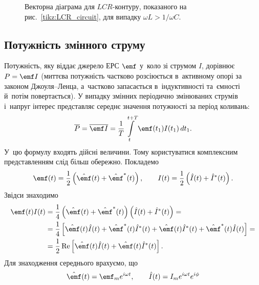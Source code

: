 \begin{figure}[h!]
	\centering
	\caption{Векторна діаграма для $LCR$-контуру, показаного на рис.~\ref{tikz:LCR_circuit}, для випадку $\omega L > 1/\omega C$.}
	\label{tikz:vector_diagram_full}
\end{figure}

\subsection*{Потужність змінного струму}

Потужність, яку віддає джерело ЕРС $\emf$ у~коло зі струмом $I$, дорівнює $P = \emf I$
(миттєва потужність частково розсіюється в~активному опорі за законом Джоуля--Ленца, а~частково запасається в~індуктивності та~ємності й~потім повертається). У
випадку змінних періодично змінюваних струмів і~напруг
інтерес представляє середнє значення потужності за період коливань:
\begin{equation}\label{eq:average_power}
	\overline{P} = \overline{\emf I} = \frac{1}{T}\int\limits_{t}^{t+T} \emf(t_1)I(t_1) \, dt_1.
\end{equation}
У~цю формулу входять дійсні величини. Тому користуватися
комплексним представленням слід більш обережно. Покладемо
\begin{equation*}
	\emf(t) = \frac{1}{2}\left(\hat{\emf}(t) + \hat{\emf}^*(t)\right), \qquad
	I(t) = \frac{1}{2}\left(\hat{I}(t) + \hat{I}^*(t)\right).
\end{equation*}
Звідси знаходимо
\begin{equation*}
	\begin{aligned}
		\emf(t)I(t) & = \frac{1}{4}\left(\hat{\emf}(t) + \hat{\emf}^*(t)\right)\left(\hat{I}(t) + \hat{I}^*(t)\right) =                                         \\
		            & = \frac{1}{4}\left[\hat{\emf}(t)\hat{I}(t) + \hat{\emf}^*(t)\hat{I}^*(t) + \hat{\emf}(t)\hat{I}^*(t) + \hat{\emf}^*(t)\hat{I}(t)\right] = \\
		            & = \frac{1}{2}\operatorname{Re}\left[\hat{\emf}(t)\hat{I}(t) + \hat{\emf}(t)\hat{I}^*(t)\right].
	\end{aligned}
\end{equation*}
Для знаходження середнього врахуємо, що
\begin{equation*}
	\hat{\emf}(t) = \emf_m e^{i\omega t}, \qquad
	\hat{I}(t) = I_m e^{i\omega t} e^{i\phi}
\end{equation*}
